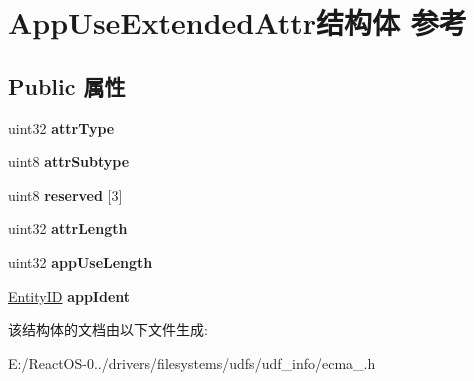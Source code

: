 \hypertarget{struct_app_use_extended_attr}{}\section{App\+Use\+Extended\+Attr结构体 参考}
\label{struct_app_use_extended_attr}
\subsection*{Public 属性}
\begin{DoxyCompactItemize}
\item 
\mbox{\label{struct_app_use_extended_attr_a6c7c789b4382dea7c4603d3436d89f6e}} 
uint32 {\bfseries attr\+Type}
\item 
\mbox{\label{struct_app_use_extended_attr_a6f584e75f8ad07193110b24941f9d901}} 
uint8 {\bfseries attr\+Subtype}
\item 
\mbox{\label{struct_app_use_extended_attr_aa1c60c7dc120d9eb16ef1182b5b296b1}} 
uint8 {\bfseries reserved} \mbox{[}3\mbox{]}
\item 
\mbox{\label{struct_app_use_extended_attr_a56c149df0dedecfbefbb69c4d41e8d17}} 
uint32 {\bfseries attr\+Length}
\item 
\mbox{\label{struct_app_use_extended_attr_a84145874bf45d1f1fb43b760f55fe8ec}} 
uint32 {\bfseries app\+Use\+Length}
\item 
\mbox{\label{struct_app_use_extended_attr_a75b64f5fe47374f00bb8c19524e5cec5}} 
\hyperlink{struct_entity_i_d}{Entity\+ID} {\bfseries app\+Ident}
\end{DoxyCompactItemize}


该结构体的文档由以下文件生成\+:\begin{DoxyCompactItemize}
\item 
E\+:/\+React\+O\+S-\/0../drivers/filesystems/udfs/udf\+\_\+info/ecma\+\_.\+h\end{DoxyCompactItemize}
